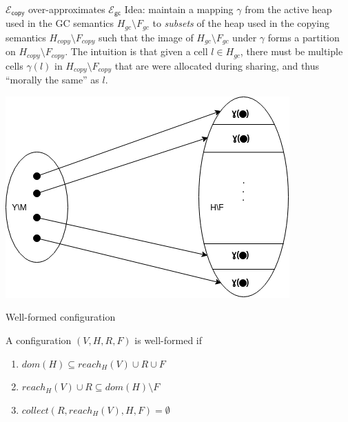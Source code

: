 \documentclass{beamer}
\newcommand{\ms}[1]{\ensuremath{\mathsf{#1}}}
\newcommand{\gcSem}{\ensuremath{\mathcal{E}_{\ms{gc}}}}
\newcommand{\copySem}{\ensuremath{\mathcal{E}_{\ms{copy}}}}
\theoremstyle{definition}
\begin{document}
\begin{frame}{\copySem{} over-approximates \gcSem}
  Idea: maintain a mapping $\gamma$ from the active heap used in the GC semantics
  $H_{gc}\setminus F_{gc}$ to \emph{subsets} of
the heap used in the copying semantics $H_{copy} \setminus F_{copy}$ such that the image of 
$H_{gc}\setminus F_{gc}$ under $\gamma$ forms a partition on $H_{copy} \setminus F_{copy}$.
The intuition is that given a cell $l \in H_{gc}$, there must be multiple cells
$\gamma(l)$ in  $H_{copy}\setminus F_{copy}$  
that are were allocated during sharing, and thus ``morally the same'' as $l$.

\begin{center}
\includegraphics[scale=0.4]{relation}
\end{center}
\end{frame}

\begin{frame}{Well-formed configuration}
  \begin{definition} A configuration $(V,H,R,F)$ is well-formed if 
	\begin{enumerate}
		\item $dom(H) \subseteq reach_H(V) \cup R \cup F$
		\item $reach_H(V) \cup R \subseteq dom(H) \setminus F$
		\item $collect(R,reach_H(V),H,F) = \emptyset$
	\end{enumerate}
\end{definition}
\end{frame}
\end{document}
